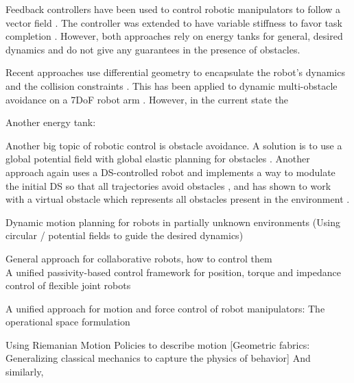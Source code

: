 \documentclass[conference]{IEEEtran}
\begin{document}
Feedback controllers have been used to control robotic manipulators to follow a vector field \cite{li1999passive}. The controller was extended to have variable stiffness to favor task completion \cite{kronander2015passive}. However, both approaches rely on energy tanks for general, desired dynamics and do not give any guarantees in the presence of obstacles.

Recent approaches use differential geometry to encapsulate the robot's dynamics and the collision constraints \cite{peters2008unifying}.
This has been applied to dynamic multi-obstacle avoidance on a 7DoF robot arm \cite{van2022geometric}. However, in the current state the 


Another energy tank:
\cite{ferraguti2013tank}


Another big topic of robotic control is obstacle avoidance. A solution is to use a global potential field with global elastic planning for obstacles \cite{tulbure2020closing}. Another approach again uses a DS-controlled robot and implements a way to modulate the initial DS so that all trajectories avoid obstacles \cite{huber2022avoiding}, and has shown to work with a virtual obstacle which represents all obstacles present in the environment \cite{huber2022fast}.

Dynamic motion planning for robots in partially unknown environments (Using circular / potential fields to guide the desired dynamics)
\cite{haddadin2011dynamic}

General approach for collaborative robots, how to control them \\
A unified passivity-based control framework for position, torque and impedance control of flexible joint robots
\cite{albu2007unified}

A unified approach for motion and force control of robot manipulators: The operational space formulation
\cite{khatib1987unified}

Using Riemanian Motion Policies to describe motion [Geometric fabrics: Generalizing classical mechanics to capture the physics of behavior]
\cite{van2022geometric}
And similarly,
\cite{cheng2020rmp}
\end{document}
